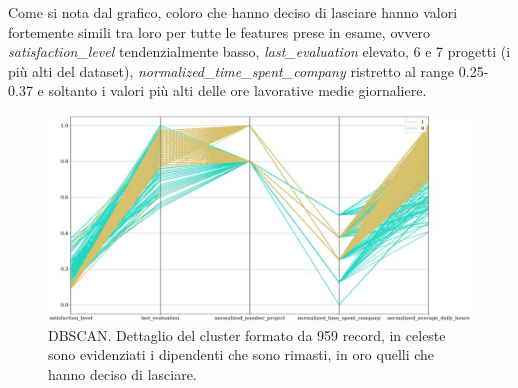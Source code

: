 	Come si nota dal grafico, coloro che hanno deciso di lasciare hanno valori fortemente simili tra loro per tutte le features prese in esame, ovvero \textit{satisfaction\_level} tendenzialmente basso, \textit{last\_evaluation} elevato, 6 e 7 progetti (i più alti del dataset), \textit{normalized\_time\_spent\_company} ristretto al range 0.25-0.37 e soltanto i valori più alti delle ore lavorative medie giornaliere.
	\begin{figure}[H]
		\centering
		\includegraphics[width=15cm]{Images/Clustering/DBParallelLeft.jpg}
		\vspace{-0.2cm}
		\caption{DBSCAN. Dettaglio del cluster formato da 959 record, in celeste sono evidenziati i dipendenti che sono rimasti, in oro quelli che hanno deciso di lasciare.}
	\end{figure}
	
